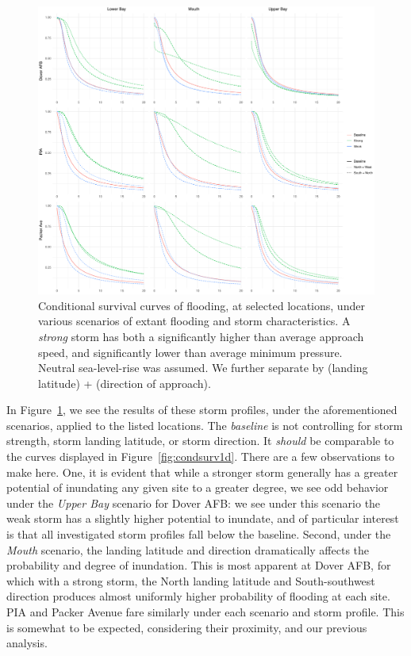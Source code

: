 \begin{figure}[t]
    \centering
    \includegraphics[width=0.95\linewidth]{./plots/condsurv_reg/condsurv_reg_1d.pdf}
    \caption{Conditional survival curves of flooding, at selected locations, under various 
        scenarios of extant flooding and storm characteristics.  A \emph{strong} storm has
        both a significantly higher than average approach speed, and significantly lower 
        than average minimum pressure. Neutral sea-level-rise was assumed.  We further
        separate by (landing latitude) + (direction of approach).\label{fig:condsurvreg1d}
        }
\end{figure}

In Figure~\ref{fig:condsurvreg1d}, we see the results of these storm profiles, under the
    aforementioned scenarios, applied to the listed locations.   The \emph{baseline} is not
    controlling for storm strength, storm landing latitude, or storm direction.  It 
    \emph{should} be comparable to the curves displayed in Figure~\ref{fig:condsurv1d}.  
    There are a few observations to make here.  One, it is evident that while a stronger 
    storm generally has a greater potential of inundating any given site to a greater 
    degree, we see odd behavior under the \emph{Upper Bay} scenario for Dover AFB: we see
    under this scenario the weak storm has a slightly higher potential to inundate, and 
    of particular interest is that all investigated storm profiles fall below the baseline.
    Second, under the \emph{Mouth} scenario, the landing latitude and direction dramatically
    affects the probability and degree of inundation.  This is most apparent at Dover AFB,
    for which with a strong storm, the North landing latitude and South-southwest direction
    produces almost uniformly higher probability of flooding at each site.
    PIA and Packer Avenue fare similarly under each scenario and storm profile.  This is
    somewhat to be expected, considering their proximity, and our previous analysis.

